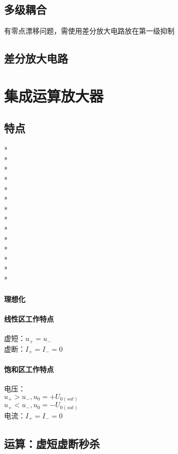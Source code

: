 \documentclass[UTF8, fontset=none]{ctexart}
\begin{document}
\begin{multicols*}{8}
\subsection{多级耦合}
有零点漂移问题，需使用差分放大电路放在第一级抑制\\%
\subsection{差分放大电路}%

\section{集成运算放大器}
\subsection{特点}%
*\\
*\\
*\\
*\\
*\\
*\\
*\\
*\\
*\\
*\\
*\\
*\\
*\\
*
\paragraph{理想化}
\paragraph{线性区工作特点}
虚短：$u_+ = u_-$\\
虚断：$I_+ = I_- = 0$\\
\paragraph{饱和区工作特点}
电压：\\
$u_+ > u_-, u_0 = +U_{0(sat)}$\\
$u_+ < u_-, u_0 = -U_{0(sat)}$\\
电流：$I_+ = I_- = 0$\\
\subsection{运算：虚短虚断秒杀}

\end{multicols*}
\end{document}
